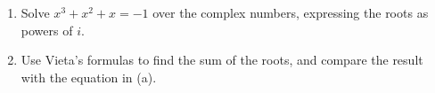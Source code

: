\begin{enumerate}
\item[(a)] Solve $x^3+x^2+x=-1$ over the complex numbers, expressing the roots as powers of $i$.
\item[(b)] Use Vieta's formulas to find the sum of the roots, and compare the result with the equation in (a).
\end{enumerate}
